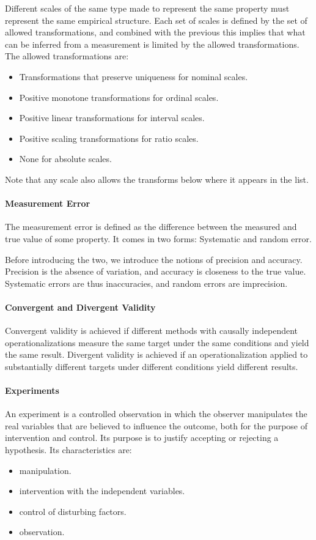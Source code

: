 Different scales of the same type made to represent the same property must represent the same empirical structure. Each set of scales is defined by the set of allowed transformations, and combined with the previous this implies that what can be inferred from a measurement is limited by the allowed transformations. The allowed transformations are:
\begin{itemize}
	\item Transformations that preserve uniqueness for nominal scales.
	\item Positive monotone transformations for ordinal scales.
	\item Positive linear transformations for interval scales.
	\item Positive scaling transformations for ratio scales.
	\item None for absolute scales.
\end{itemize}
Note that any scale also allows the transforms below where it appears in the list.

\paragraph{Measurement Error}
The measurement error is defined as the difference between the measured and true value of some property. It comes in two forms: Systematic and random error.

Before introducing the two, we introduce the notions of precision and accuracy. Precision is the absence of variation, and accuracy is closeness to the true value. Systematic errors are thus inaccuracies, and random errors are imprecision.

\paragraph{Convergent and Divergent Validity}
Convergent validity is achieved if different methods with causally independent operationalizations measure the same target under the same conditions and yield the same result. Divergent validity is achieved if an operationalization applied to substantially different targets under different conditions yield different results.

\paragraph{Experiments}
An experiment is a controlled observation in which the observer manipulates the real variables that are believed to influence the outcome, both for the purpose of intervention and control. Its purpose is to justify accepting or rejecting a hypothesis. Its characteristics are:
\begin{itemize}
	\item manipulation.
	\item intervention with the independent variables.
	\item control of disturbing factors.
	\item observation.
\end{itemize}

